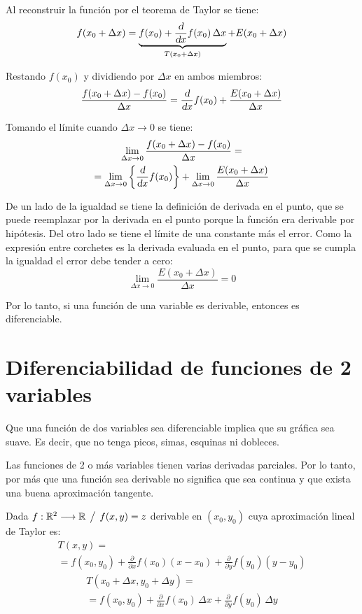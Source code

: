 \documentclass[a5paper,12pt,twoside]{book}
\begin{document}
Al reconstruir la función por el teorema de Taylor se tiene:
\begin{equation*}
    f(x_0 + \Delta x) = \underbrace{f(x_0)+\frac{\textsl{d}}{\textsl{d} x} f(x_0) \, \Delta x}_{T(x_0 + \Delta x)} + E(x_0 + \Delta x)
\end{equation*}

Restando $f(x_0)$ y dividiendo por $\Delta x$ en ambos miembros:
\begin{equation*}
    \frac{f(x_0 + \Delta x)-f(x_0)}{\Delta x} = \frac{\textsl{d}}{\textsl{d} x} f(x_0) + \frac{E(x_0 + \Delta x)}{\Delta x}
\end{equation*}

Tomando el límite cuando $\Delta x \to 0$ se tiene:
\begin{multline*}
    \lim_{\Delta x \to 0} \frac{f(x_0 + \Delta x)-f(x_0)}{\Delta x} =
    \\
    = \lim_{\Delta x \to 0} { \left\{ { \frac{\textsl{d}}{\textsl{d} x} f(x_0) } \right\} } + \lim_{\Delta x \to 0} \frac{E(x_0 + \Delta x)}{\Delta x}
\end{multline*}

De un lado de la igualdad se tiene la definición de derivada en el punto, que se puede reemplazar por la derivada en el punto porque la función era derivable por hipótesis. Del otro lado se tiene el límite de una constante más el error. Como la expresión entre corchetes es la derivada evaluada en el punto, para que se cumpla la igualdad el error debe tender a cero:
\begin{equation*}
    \lim_{\Delta x \to 0} \frac{E(x_0 + \Delta x)}{\Delta x} = 0
\end{equation*}

Por lo tanto, si una función de una variable es derivable, entonces es diferenciable.


\section{Diferenciabilidad de funciones de 2 variables}

Que una función de dos variables sea diferenciable implica que su gráfica sea suave. Es decir, que no tenga picos, simas, esquinas ni dobleces.

Las funciones de 2 o más variables tienen varias derivadas parciales. Por lo tanto, por más que una función sea derivable no significa que sea continua y que exista una buena aproximación tangente.

Dada $f: \mathbb{R}^2 \longrightarrow \mathbb{R} \hspace{1ex} \big/ \hspace{1ex} f(x,y)=z$ derivable en $(x_0,y_0)$ cuya aproximación lineal de Taylor es:
\begin{multline*}
    T(x,y) =
    \\
    = f(x_0,y_0) + \frac{\partial}{\partial x} f(x_0) \left( x-x_0 \right) + \frac{\partial}{\partial y} f(y_0) \left( y-y_0 \right)
\end{multline*}
\begin{multline*}
    T(x_0 + \Delta x,y_0 + \Delta y) =
    \\
    = f(x_0,y_0) + \frac{\partial}{\partial x} f(x_0) \, \Delta x + \frac{\partial}{\partial y} f(y_0) \, \Delta y
\end{multline*}
\end{document}
